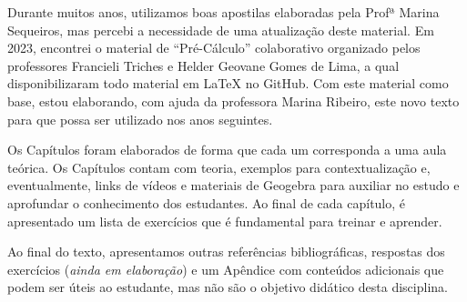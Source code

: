 Durante muitos anos, utilizamos boas apostilas elaboradas pela Profª Marina Sequeiros, mas percebi a necessidade de uma atualização deste material. Em 2023, encontrei o material de ``Pré-Cálculo'' colaborativo organizado pelos professores Francieli Triches e Helder Geovane Gomes de Lima, a qual disponibilizaram todo material em LaTeX no GitHub. Com este material como base, estou elaborando, com ajuda da professora Marina Ribeiro, este novo texto para que possa ser utilizado nos anos seguintes.

Os Capítulos foram elaborados de forma que cada um corresponda a uma aula teórica.
Os Capítulos contam com teoria, exemplos para contextualização e, eventualmente, links de vídeos e materiais de Geogebra para auxiliar no estudo e aprofundar o conhecimento dos estudantes. Ao final de cada capítulo, é apresentado um lista de exercícios que é fundamental para treinar e aprender.

Ao final do texto, apresentamos outras referências bibliográficas, respostas dos exercícios (\textit{ainda em elaboração}) e um Apêndice com conteúdos adicionais que podem ser úteis ao estudante, mas não são o objetivo didático desta disciplina.

\setcounter{tocdepth}{0}
